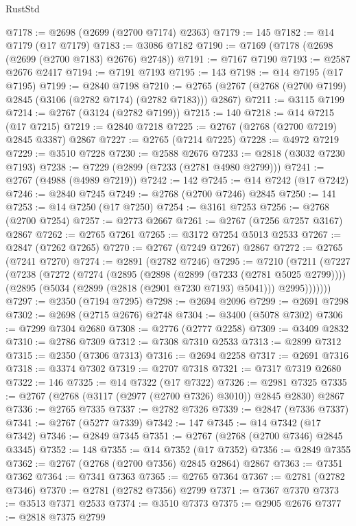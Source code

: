 \begin{lexlean}{RustStd}
\begin{coremodule}
@7178 := @2698 (@2699 (@2700 @7174) @2363)
@7179 := 145
@7182 := @14 @7179 (@17 @7179)
@7183 := @3086 @7182
@7190 := @7169 (@7178 (@2698 (@2699 (@2700 @7183) @2676) @2748))
@7191 := @7167 @7190
@7193 := @2587 @2676 @2417
@7194 := @7191 @7193
@7195 := 143
@7198 := @14 @7195 (@17 @7195)
@7199 := @2840 @7198
@7210 := @2765 (@2767 (@2768 (@2700 @7199) @2845 (@3106 (@2782 @7174) (@2782 @7183))) @2867)
@7211 := @3115 @7199
@7214 := @2767 (@3124 (@2782 @7199))
@7215 := 140
@7218 := @14 @7215 (@17 @7215)
@7219 := @2840 @7218
@7225 := @2767 (@2768 (@2700 @7219) @2845 @3387) @2867
@7227 := @2765 (@7214 @7225)
@7228 := @4972 @7219
@7229 := @3510 @7228
@7230 := @2588 @2676
@7233 := @2818 (@3032 @7230 @7193)
@7238 := @7229 (@2899 (@7233 (@2781 @4980 @2799)))
@7241 := @2767 (@4988 (@4989 @7219))
@7242 := 142
@7245 := @14 @7242 (@17 @7242)
@7246 := @2840 @7245
@7249 := @2768 (@2700 @7246) @2845
@7250 := 141
@7253 := @14 @7250 (@17 @7250)
@7254 := @3161 @7253
@7256 := @2768 (@2700 @7254)
@7257 := @2773 @2667
@7261 := @2767 (@7256 @7257 @3167) @2867
@7262 := @2765 @7261
@7265 := @3172 @7254 @5013 @2533
@7267 := @2847 (@7262 @7265)
@7270 := @2767 (@7249 @7267) @2867
@7272 := @2765 (@7241 @7270)
@7274 := @2891 (@2782 @7246)
@7295 := @7210
    (@7211
      (@7227
        (@7238
          (@7272
            (@7274
              (@2895
                (@2898 (@2899 (@7233 (@2781 @5025 @2799))))
                (@2895 (@5034 (@2899 (@2818 (@2901 @7230 @7193) @5041))) @2995)))))))
@7297 := @2350 (@7194 @7295)
@7298 := @2694 @2096
@7299 := @2691 @7298
@7302 := @2698 (@2715 @2676) @2748
@7304 := @3400 (@5078 @7302)
@7306 := @7299 @7304 @2680
@7308 := @2776 (@2777 @2258)
@7309 := @3409 @2832
@7310 := @2786 @7309
@7312 := @7308 @7310 @2533
@7313 := @2899 @7312
@7315 := @2350 (@7306 @7313)
@7316 := @2694 @2258
@7317 := @2691 @7316
@7318 := @3374 @7302
@7319 := @2707 @7318
@7321 := @7317 @7319 @2680
@7322 := 146
@7325 := @14 @7322 (@17 @7322)
@7326 := @2981 @7325
@7335 := @2767 (@2768 (@3117 (@2977 (@2700 @7326) @3010)) @2845 @2830) @2867
@7336 := @2765 @7335
@7337 := @2782 @7326
@7339 := @2847 (@7336 @7337)
@7341 := @2767 (@5277 @7339)
@7342 := 147
@7345 := @14 @7342 (@17 @7342)
@7346 := @2849 @7345
@7351 := @2767 (@2768 (@2700 @7346) @2845 @3345)
@7352 := 148
@7355 := @14 @7352 (@17 @7352)
@7356 := @2849 @7355
@7362 := @2767 (@2768 (@2700 @7356) @2845 @2864) @2867
@7363 := @7351 @7362
@7364 := @7341 @7363
@7365 := @2765 @7364
@7367 := @2781 (@2782 @7346)
@7370 := @2781 (@2782 @7356) @2799
@7371 := @7367 @7370
@7373 := @3513 @7371 @2533
@7374 := @3510 @7373
@7375 := @2905 @2676
@7377 := @2818 @7375 @2799

\end{coremodule}
\end{lexlean}
